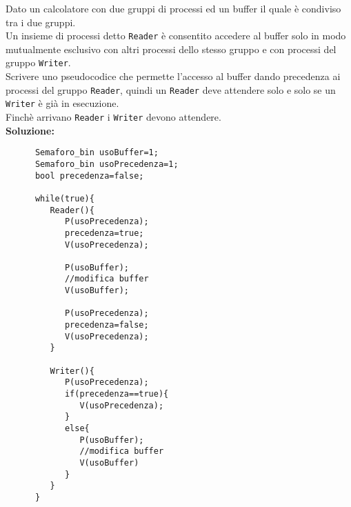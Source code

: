 \documentclass{article}
\begin{document}
   Dato un calcolatore con due gruppi di processi ed un buffer il quale è condiviso tra i due gruppi.\\
   Un insieme di processi detto \verb+Reader+ è consentito accedere al buffer solo in modo mutualmente esclusivo con altri processi dello stesso gruppo e con processi del gruppo \verb+Writer+.\\
   Scrivere uno pseudocodice che permette l'accesso al buffer dando precedenza ai processi del gruppo \verb+Reader+, quindi un \verb+Reader+ deve attendere solo e solo se un \verb+Writer+ è già in esecuzione.\\
   Finchè arrivano \verb+Reader+ i \verb+Writer+ devono attendere.\\
   \textbf{Soluzione:}
   \begin{lstlisting}
      Semaforo_bin usoBuffer=1;
      Semaforo_bin usoPrecedenza=1;
      bool precedenza=false;

      while(true){
         Reader(){
            P(usoPrecedenza);
            precedenza=true;
            V(usoPrecedenza);

            P(usoBuffer);
            //modifica buffer
            V(usoBuffer);

            P(usoPrecedenza);
            precedenza=false;
            V(usoPrecedenza);
         }

         Writer(){
            P(usoPrecedenza);
            if(precedenza==true){
               V(usoPrecedenza);
            }
            else{
               P(usoBuffer);
               //modifica buffer
               V(usoBuffer)
            }
         }
      }
   \end{lstlisting}
\end{document}
